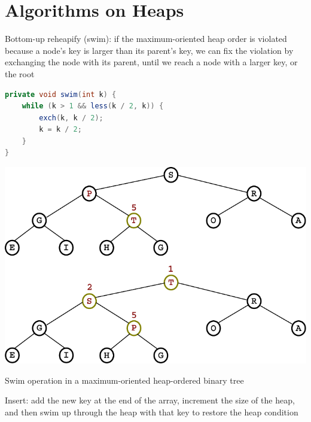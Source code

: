 \documentclass[8pt,a4paper,compress]{beamer}
\begin{document}
\section{Algorithms on Heaps}
\begin{frame}[fragile]
Bottom-up reheapify (swim): if the maximum-oriented heap order is violated because a node's key is larger than its parent's key, we can fix the violation by exchanging the node with its parent, until we reach a node with a larger key, or the root

\bigskip

\begin{minipage}{150pt}
\begin{lstlisting}[language=Java]
private void swim(int k) {
    while (k > 1 && less(k / 2, k)) { 
        exch(k, k / 2); 
        k = k / 2; 
    }
}
\end{lstlisting}
\end{minipage}%
\begin{minipage}{130pt}
\hfill \includegraphics[scale=0.35]{./figures/heapify_swim.pdf}
\end{minipage}

\smallskip

\begin{center}
\tiny {Swim operation in a maximum-oriented heap-ordered binary tree}
\end{center}

\bigskip

Insert: add the new key at the end of the array, increment the size of the heap, and then swim up through the heap with that key to restore the heap condition
\end{frame}
\end{document}

